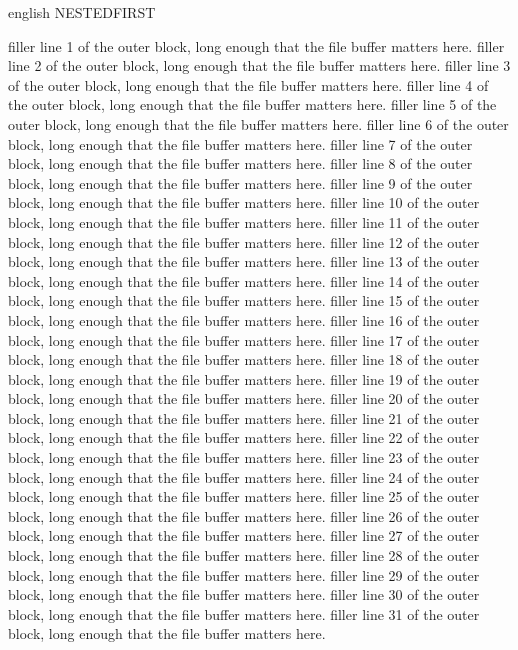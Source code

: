 \documentclass{article}
\begin{document}
\begin{onlyin}{english}
NESTEDFIRST

filler line 1 of the outer block, long enough that the file buffer matters here.
filler line 2 of the outer block, long enough that the file buffer matters here.
filler line 3 of the outer block, long enough that the file buffer matters here.
filler line 4 of the outer block, long enough that the file buffer matters here.
filler line 5 of the outer block, long enough that the file buffer matters here.
filler line 6 of the outer block, long enough that the file buffer matters here.
filler line 7 of the outer block, long enough that the file buffer matters here.
filler line 8 of the outer block, long enough that the file buffer matters here.
filler line 9 of the outer block, long enough that the file buffer matters here.
filler line 10 of the outer block, long enough that the file buffer matters here.
filler line 11 of the outer block, long enough that the file buffer matters here.
filler line 12 of the outer block, long enough that the file buffer matters here.
filler line 13 of the outer block, long enough that the file buffer matters here.
filler line 14 of the outer block, long enough that the file buffer matters here.
filler line 15 of the outer block, long enough that the file buffer matters here.
filler line 16 of the outer block, long enough that the file buffer matters here.
filler line 17 of the outer block, long enough that the file buffer matters here.
filler line 18 of the outer block, long enough that the file buffer matters here.
filler line 19 of the outer block, long enough that the file buffer matters here.
filler line 20 of the outer block, long enough that the file buffer matters here.
filler line 21 of the outer block, long enough that the file buffer matters here.
filler line 22 of the outer block, long enough that the file buffer matters here.
filler line 23 of the outer block, long enough that the file buffer matters here.
filler line 24 of the outer block, long enough that the file buffer matters here.
filler line 25 of the outer block, long enough that the file buffer matters here.
filler line 26 of the outer block, long enough that the file buffer matters here.
filler line 27 of the outer block, long enough that the file buffer matters here.
filler line 28 of the outer block, long enough that the file buffer matters here.
filler line 29 of the outer block, long enough that the file buffer matters here.
filler line 30 of the outer block, long enough that the file buffer matters here.
filler line 31 of the outer block, long enough that the file buffer matters here.

\end{onlyin}
\end{document}
